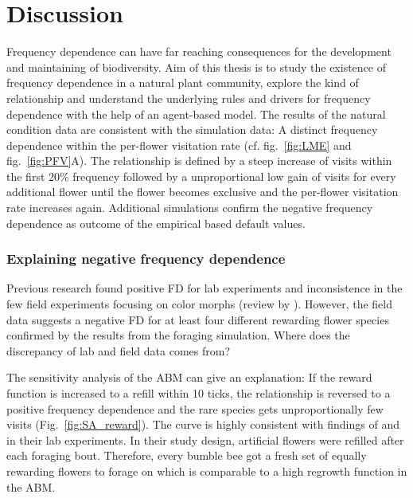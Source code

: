 \label{ch:discussion}
\section{Discussion}

Frequency dependence can have far reaching consequences for the development and maintaining of biodiversity. Aim of this thesis is to study the existence of frequency dependence in a natural plant community, explore the kind of relationship and understand the underlying rules and drivers for frequency dependence with the help of an agent-based model.
The results of the natural condition data are consistent with the simulation data: A distinct frequency dependence within the per-flower visitation rate (cf. fig.~\ref{fig:LME} and fig.~\ref{fig:PFV}A). The relationship is defined by a steep increase of visits within the first 20\% frequency followed by a unproportional low gain of visits for every additional flower until the flower becomes exclusive and the per-flower visitation rate increases again. Additional simulations confirm the negative frequency dependence as outcome of the empirical based default values.

\subsubsection*{Explaining negative frequency dependence}

Previous research found positive FD for lab experiments and inconsistence in the few field experiments focusing on color morphs (review by \citealt{smithson2001pollinator}). However, the field data suggests a negative FD for at least four different rewarding flower species confirmed by the results from the foraging simulation. Where does the discrepancy of lab and field data comes from? 

The sensitivity analysis of the ABM can give an explanation: If the reward function is increased to a refill within 10 ticks, the relationship is reversed to a positive frequency dependence and the rare species gets unproportionally few visits (Fig.~\ref{fig:SA_reward}). The curve is highly consistent with findings of  \cite{smithson1997density} and \cite{smithson1996frequency} in their lab experiments. In their study design, artificial flowers were refilled after each foraging bout. Therefore, every bumble bee got a fresh set of equally rewarding flowers to forage on which is comparable to a high regrowth function in the ABM.

